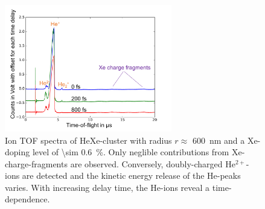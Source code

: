%
\begin{figure}
	\centering
		\includegraphics[width=0.65\textwidth]{images/results/TOF-helium-xenon-cluster-60-2.png}
	\caption[TOF spectra of HeXe-clusters with a \SI{\sim 0.6}{\percent} Xe-doping at various $\Delta t$.]{Ion TOF spectra of HeXe-cluster with radius $r\approx$ \SI{600}{\nano\meter} and a Xe-doping level of \SI{\sim 0.6}{\percent}. Only neglible contributions from Xe-charge-fragments are observed. Conversely, doubly-charged He$^{2+}$-ions are detected and the kinetic energy release of the He-peaks varies. With increasing delay time, the He-ions reveal a time-dependence.}
	\label{fig:TOF-helium-xenon-cluster-60}
\end{figure}
%
